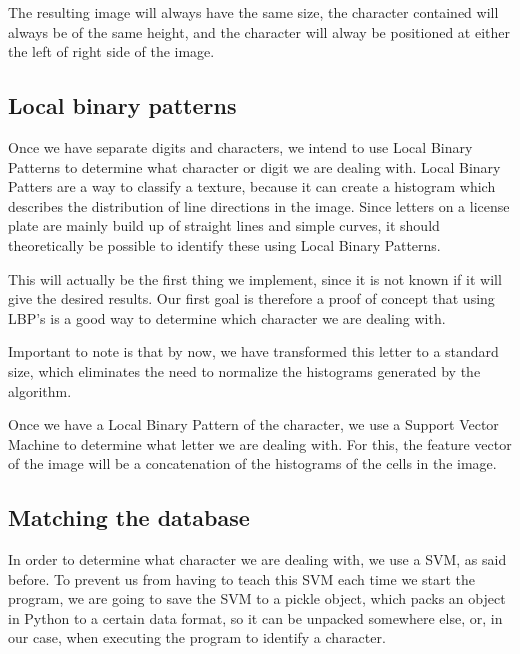 \documentclass[a4paper]{article}
\begin{document}
The resulting image will always have the same size, the character contained will
always be of the same height, and the character will alway be positioned at 
either the left of right side of the image.

\subsection{Local binary patterns}

Once we have separate digits and characters, we intend to use Local Binary 
Patterns to determine what character or digit we are dealing with. Local Binary 
Patters are a way to classify a texture, because it can create a histogram which
describes the distribution of line directions in the image. Since letters on a 
license plate are mainly build up of straight lines and simple curves, it should 
theoretically be possible to identify these using Local Binary Patterns.

This will actually be the first thing we implement, since it is not known if it 
will give the desired results. Our first goal is therefore a proof of concept 
that using LBP's is a good way to determine which character we are dealing with.

Important to note is that by now, we have transformed this letter to a standard 
size, which eliminates the need to normalize the histograms generated by the 
algorithm.

Once we have a Local Binary Pattern of the character, we use a Support Vector 
Machine to determine what letter we are dealing with. For this, the feature 
vector of the image will be a concatenation of the histograms of the cells in 
the image.

\subsection{Matching the database}

In order to determine what character we are dealing with, we use a SVM, as said 
before. To prevent us from having to teach this SVM each time we start the 
program, we are going to save the SVM to a pickle object, which packs an object 
in Python to a certain data format, so it can be unpacked somewhere else, or, in 
our case, when executing the program to identify a character.
\end{document}

